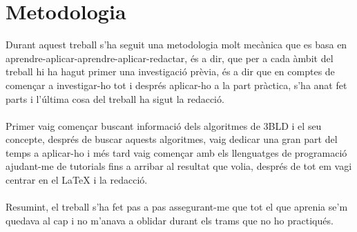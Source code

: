 \pagestyle{Metodologia}
\part*{Metodologia}

Durant aquest treball s'ha seguit una metodologia molt mecànica que es basa en aprendre-aplicar-aprendre-aplicar-redactar, és a dir, que per a cada àmbit del treball hi ha hagut primer una investigació prèvia, és a dir que en comptes de començar a investigar-ho tot i després aplicar-ho a la part pràctica, s'ha anat fet parts i l'última cosa del treball ha sigut la redacció.
\\\\Primer vaig començar buscant informació dels algoritmes de 3BLD i el seu concepte, després de buscar aquests algoritmes, vaig dedicar una gran part del temps a aplicar-ho i més tard vaig començar amb els llenguatges de programació ajudant-me de tutorials fins a arribar al resultat que volia, després de tot em vagi centrar en el LaTeX i la redacció.
\\\\Resumint, el treball s'ha fet pas a pas assegurant-me que tot el que aprenia se'm quedava al cap i no m'anava a oblidar durant els trams que no ho practiqués.